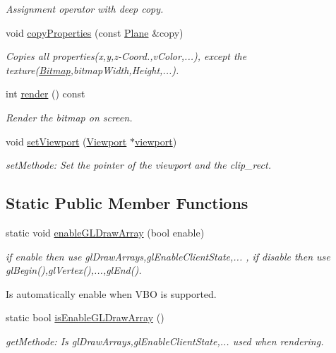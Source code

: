 \begin{DoxyCompactItemize}
\begin{DoxyCompactList}\small\item\em Assignment operator with deep copy. \item\end{DoxyCompactList}\item 
void \hyperlink{class_f2_c_1_1_plane_ac3ee4529b515cc641b6e9b27d76fc2ef}{copyProperties} (const \hyperlink{class_f2_c_1_1_plane}{Plane} \&copy)
\begin{DoxyCompactList}\small\item\em Copies all properties(x,y,z-\/Coord.,vColor,...), except the texture(\hyperlink{class_f2_c_1_1_bitmap}{Bitmap},bitmapWidth,Height,...). \item\end{DoxyCompactList}\item 
int \hyperlink{class_f2_c_1_1_plane_ace8103ddb3071c72aa40fff492c23135}{render} () const 
\begin{DoxyCompactList}\small\item\em Render the bitmap on screen. \item\end{DoxyCompactList}\item 
void \hyperlink{class_f2_c_1_1_plane_a22fe65ae565a11384d5ea1d44d705b1a}{setViewport} (\hyperlink{class_f2_c_1_1_viewport}{Viewport} $\ast$\hyperlink{class_f2_c_1_1_plane_a755aaa0644174adc1574d04a1378c22f}{viewport})
\begin{DoxyCompactList}\small\item\em setMethode: Set the pointer of the viewport and the clip\_\-rect. \item\end{DoxyCompactList}\end{DoxyCompactItemize}
\subsection*{Static Public Member Functions}
\begin{DoxyCompactItemize}
\item 
static void \hyperlink{class_f2_c_1_1_plane_a9aa6b1844087dffb97f46439258e33f7}{enableGLDrawArray} (bool enable)
\begin{DoxyCompactList}\small\item\em if enable then use glDrawArrays,glEnableClientState,... , if disable then use glBegin(),glVertex(),...,glEnd(). \par
 Is automatically enable when VBO is supported. \item\end{DoxyCompactList}\item 
\hypertarget{class_f2_c_1_1_plane_ad618a0c2341add433197732e4f452358}{
static bool \hyperlink{class_f2_c_1_1_plane_ad618a0c2341add433197732e4f452358}{isEnableGLDrawArray} ()}
\label{class_f2_c_1_1_plane_ad618a0c2341add433197732e4f452358}

\begin{DoxyCompactList}\small\item\em getMethode: Is glDrawArrays,glEnableClientState,... used when rendering. \item\end{DoxyCompactList}\end{DoxyCompactItemize}
